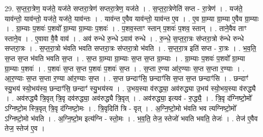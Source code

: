 \documentclass[17pt]{extarticle}
\begin{document}
29. स॒प्त॒रा॒त्रेण॒ यज॑ते॒ यज॑ते सप्तरा॒त्रेण॑ सप्तरा॒त्रेण॒ यज॑ते । . स॒प्त॒रा॒त्रेणेति॑ सप्त - रा॒त्रेण॑ । . यज॑ते॒ याव॑न्तो॒ याव॑न्तो॒ यज॑ते॒ यज॑ते॒ याव॑न्तः । . याव॑न्त ए॒वैव याव॑न्तो॒ याव॑न्त ए॒व । . ए॒व ग्रा॒म्या ग्रा॒म्या ए॒वैव ग्रा॒म्याः । . ग्रा॒म्याः प॒शवः॑ प॒शवो᳚ ग्रा॒म्या ग्रा॒म्याः प॒शवः॑ । . प॒शव॒स्ताꣳ स्तान् प॒शवः॑ प॒शव॒ स्तान् । . ताने॒वैव ताꣳ स्ताने॒व । . ए॒वावा वै॒वै वाव॑ । . अव॑ रुन्धे रु॒न्धे ऽवाव॑ रुन्धे । . रु॒न्धे॒ स॒प्त॒रा॒त्रः स॑प्तरा॒त्रो रु॑न्धे रुन्धे सप्तरा॒त्रः । . स॒प्त॒रा॒त्रो भ॑वति भवति सप्तरा॒त्रः स॑प्तरा॒त्रो भ॑वति । . स॒प्त॒रा॒त्र इति॑ सप्त - रा॒त्रः । . भ॒व॒ति॒ स॒प्त स॒प्त भ॑वति भवति स॒प्त । . स॒प्त ग्रा॒म्या ग्रा॒म्याः स॒प्त स॒प्त ग्रा॒म्याः । . ग्रा॒म्याः प॒शवः॑ प॒शवो᳚ ग्रा॒म्या ग्रा॒म्याः प॒शवः॑ । . प॒शवः॑ स॒प्त स॒प्त प॒शवः॑ प॒शवः॑ स॒प्त । . स॒प्ता र॒ण्या आ॑र॒ण्याः स॒प्त स॒प्ता र॒ण्याः । . आ॒र॒ण्याः स॒प्त स॒प्ता र॒ण्या आ॑र॒ण्याः स॒प्त । . स॒प्त छन्दाꣳ॑सि॒ छन्दाꣳ॑सि स॒प्त स॒प्त छन्दाꣳ॑सि । . छन्दाꣳ॑ स्यु॒भय॑ स्यो॒भय॑स्य॒ छन्दाꣳ॑सि॒ छन्दाꣳ॑ स्यु॒भय॑स्य । . उ॒भय॒स्या व॑रुद्ध्या॒ अव॑रुद्ध्या उ॒भय॑ स्यो॒भय॒स्या व॑रुद्ध्यै । . अव॑रुद्ध्यै त्रि॒वृत् त्रि॒वृ दव॑रुद्ध्या॒ अव॑रुद्ध्यै त्रि॒वृत् । . अव॑रुद्ध्या॒ इत्यव॑ - रु॒द्ध्यै॒ । . त्रि॒वृ द॑ग्निष्टो॒मो᳚ ऽग्निष्टो॒म स्त्रि॒वृत् त्रि॒वृ द॑ग्निष्टो॒मः । . त्रि॒वृदिति॑ त्रि - वृत् । . अ॒ग्नि॒ष्टो॒मो भ॑वति भव त्यग्निष्टो॒मो᳚ ऽग्निष्टो॒मो भ॑वति । . अ॒ग्नि॒ष्टो॒म इत्य॑ग्नि - स्तो॒मः । . भ॒व॒ति॒ तेज॒ स्तेजो॑ भवति भवति॒ तेजः॑ । . तेज॑ ए॒वैव तेज॒ स्तेज॑ ए॒व । \newline
\end{document}
